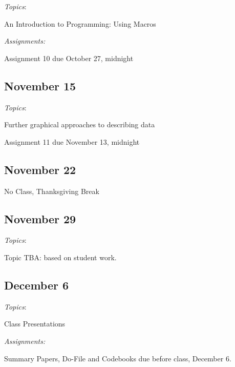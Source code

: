 \documentclass[12pt]{article}
\begin{document}
\begin{flushleft}
\textit{Topics}:

An Introduction to Programming: Using Macros

\textit {Assignments:}

Assignment 10 due October 27, midnight

\subsection{November 15}

\textit{Topics}:

Further graphical approaches to describing data 

Assignment 11 due November 13, midnight

\subsection{November 22}

No Class, Thanksgiving Break


\subsection{November 29}


\textit{Topics}:

Topic TBA: based on student work. 


\subsection{December 6}

\textit{Topics}:

Class Presentations

\textit {Assignments:}

Summary Papers, Do-File and Codebooks due before class, December 6. 


\end{flushleft}
\end{document}
